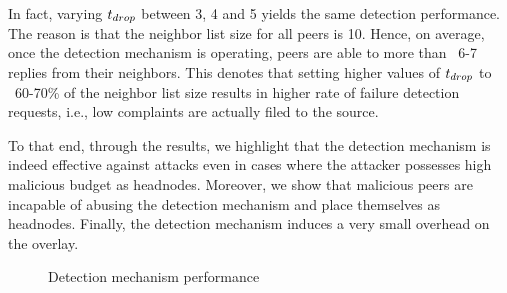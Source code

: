 In fact, varying $t_{drop}$ between 3, 4 and 5 yields the same detection performance.
The reason is that the neighbor list size for all peers is 10. 
Hence, on average, once the detection mechanism is operating, peers are able to more than ~6-7 replies from their neighbors.
This denotes that setting higher values of $t_{drop}$ to ~60-70\% of the neighbor list size results in higher rate of failure detection requests, i.e., low complaints are actually filed to the source. 

To that end, through the results, we highlight that the detection mechanism is indeed effective against \drop attacks even in cases where the attacker possesses high malicious budget as headnodes.
Moreover, we show that malicious peers are incapable of abusing the detection mechanism and place themselves as headnodes. Finally, the detection mechanism induces a very small overhead on the overlay.


\begin{figure}[t!]
\centering

  \mbox{}
 
  \mbox{}
  
   \mbox{}
  
  \caption{Detection mechanism performance}
  \label{fig:detection-results}
  \end{figure}


